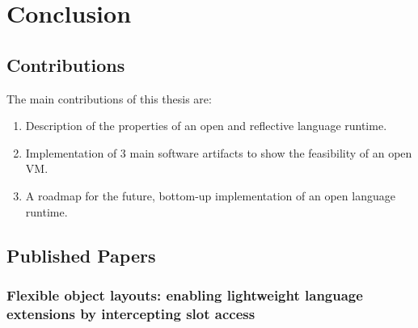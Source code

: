 

\chapter{Conclusion}
\minitoc


\section{Contributions}
The main contributions of this thesis are:
\begin{enumerate}
	\item Description of the properties of an open and reflective language runtime.
	\item Implementation of 3 main software artifacts to show the feasibility of an open VM.
	\item A roadmap for the future, bottom-up implementation of an open language runtime.
\end{enumerate}


\section{Published Papers}
\subsection{Flexible object layouts: enabling lightweight language extensions by intercepting slot access}

